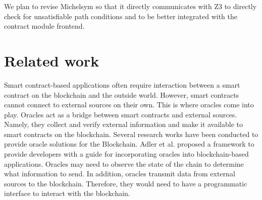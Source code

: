 \documentclass[a4paper,USenglish,american,cleveref, autoref, thm-restate]{oasics-v2021}
\begin{document}
We plan to revise Michelsym so that it directly communicates with Z3 to directly check for
unsatisfiable path conditions and to be better integrated with the contract module frontend. 

\section{Related work}
\label{sec:related-work}



Smart contract-based applications often require interaction between a smart contract on the blockchain and the outside world. However, smart contracts cannot connect to external sources on their own. This is where oracles \cite{oracle-patterns,call-action-oracle} come into play. Oracles act as a bridge between smart contracts and external sources. Namely, they collect and verify external information and make it available to smart contracts on the blockchain. Several research works have been conducted to provide oracle solutions for the Blockchain. Adler et al.\cite{blockchain-oracles} proposed a framework to provide developers with a guide for incorporating oracles into blockchain-based applications. Oracles may need to observe the state of the chain to determine what information to send. In addition, oracles transmit data from external sources to the blockchain. Therefore, they would need to have a programmatic interface to interact with the blockchain. %

\end{document}
